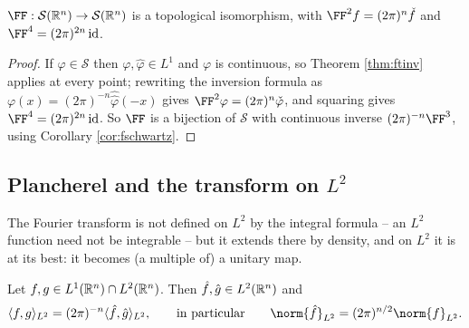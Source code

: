 \documentclass[a4paper]{scrartcl}
\newcommand{\ip}[2]{\langle #1, #2 \rangle}
\newcommand{\id}{\operatorname{id}}
\newcommand{\Sch}{\mathcal{S}}
\begin{document}
\begin{corollary}\label{cor:fsiso}
	$\FF : \Sch(\R^n)\to\Sch(\R^n)$ is a topological isomorphism, with $\FF^2 f = (2\pi)^n\check f$ and $\FF^4 = (2\pi)^{2n}\id$.
\end{corollary}

\begin{proof}
	If $\varphi \in \Sch$ then $\varphi, \hat\varphi \in L^1$ and $\varphi$ is continuous, so Theorem \ref{thm:ftinv} applies at every point; rewriting the inversion formula as $\varphi(x) = (2\pi)^{-n}\hat{\hat\varphi}(-x)$ gives $\FF^2\varphi = (2\pi)^n\check\varphi$, and squaring gives $\FF^4 = (2\pi)^{2n}\id$. So $\FF$ is a bijection of $\Sch$ with continuous inverse $(2\pi)^{-n}\FF^3$, using Corollary \ref{cor:fschwartz}.
\end{proof}

\subsection{Plancherel and the transform on \texorpdfstring{$L^2$}{L2}}

The Fourier transform is not defined on $L^2$ by the integral formula -- an $L^2$ function need not be integrable -- but it extends there by density, and on $L^2$ it is at its best: it becomes (a multiple of) a unitary map.

\begin{theorem}\label{thm:plancherel}
	Let $f, g \in L^1(\mathbb{R}^n)\cap L^2(\mathbb{R}^n)$. Then $\hat f, \hat g \in L^2(\mathbb{R}^n)$ and
	$$\ip{f}{g}_{L^2} = (2\pi)^{-n}\ip{\hat f}{\hat g}_{L^2}, \qquad \text{in particular} \qquad \norm{\hat f}_{L^2}=(2\pi)^{n/2}\norm{f}_{L^2}.$$
\end{theorem}
\end{document}
